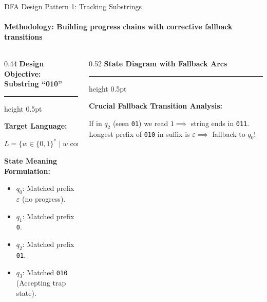 \documentclass[aspectratio=169, 10pt]{beamer}
\newcommand{\colheader}[1]{%
  {\noindent\footnotesize\bfseries\color{gimpanavy}#1}%
  \vspace{0.02cm}%
  {\color{gimpanavy!30}\hrule height 0.5pt}%
  \vspace{0.05cm}%
}
\newcommand{\cardtitle}[1]{{\noindent\footnotesize\bfseries\color{gimpanavy}#1}\par\vspace{0.03cm}}
\newcommand{\greentitle}[1]{{\noindent\footnotesize\bfseries\color{accentGreen}#1}\par\vspace{0.03cm}}
\begin{document}
\begin{frame}{DFA Design Pattern 1: Tracking Substrings}
  \framesubtitle{Methodology: Building progress chains with corrective fallback transitions}
  
  \begin{columns}[T]
    \begin{column}{0.44\textwidth}
      \colheader{Design Objective: Substring ``010''}
      \begin{tcolorbox}[conceptcard]
        \cardtitle{Target Language:}
        {\scriptsize
        $L = \{w \in \{0, 1\}^* \mid w \text{ contains substring } 010\}$
        \vspace{0.04cm}
        
        \textbf{State Meaning Formulation:}
        \begin{itemize}\setlength{\itemsep}{1.5pt}\scriptsize
          \item $q_0$: Matched prefix $\varepsilon$ (no progress).
          \item $q_1$: Matched prefix \texttt{0}.
          \item $q_2$: Matched prefix \texttt{01}.
          \item $q_3$: Matched \texttt{010} (Accepting trap state).
        \end{itemize}
        }
      \end{tcolorbox}
    \end{column}
    
    \begin{column}{0.52\textwidth}
      \colheader{State Diagram with Fallback Arcs}
      \begin{center}
      \end{center}
      \begin{tcolorbox}[examplecard]
        \greentitle{Crucial Fallback Transition Analysis:}
        {\scriptsize
        If in $q_2$ (seen \texttt{01}) we read $1 \implies$ string ends in \texttt{011}. Longest prefix of \texttt{010} in suffix is $\varepsilon \implies$ fallback to $q_0$!
        }
      \end{tcolorbox}
    \end{column}
  \end{columns}
  

\end{frame}
\end{document}
